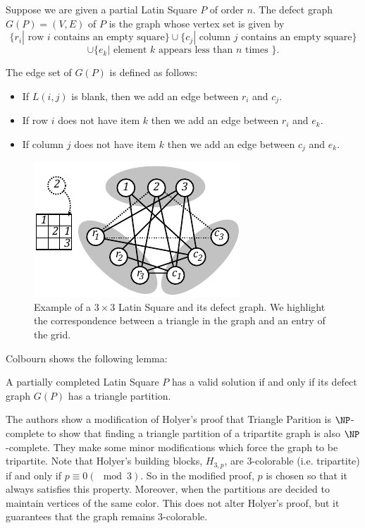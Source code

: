 \documentclass[runningheads,a4paper]{llncs}
\begin{document}
\begin{definition}
Suppose we are given a partial Latin Square $P$ of order $n$. The defect graph $G(P) = (V,E)$ of $P$ is the graph whose vertex set is given by $$\{ r_i | \text{ row } i \text{ contains an empty square} \} \cup \{ c_j | \text{ column } j \text{ contains an empty square} \} $$
$$ \cup \{ e_k | \text{ element } k\text{ appears less than } n \text{ times } \} .$$ 

The edge set of $G(P)$ is defined as follows: 

\begin{itemize}
	\item If $L(i,j)$ is blank, then we add an edge between $r_i$ and $c_j$. 
	\item If row $i$ does not have item $k$ then we add an edge between $r_i$ and $e_k$. 
	\item If column $j$ does not have item $k$ then we add an edge between $c_j$ and $e_k$.
\end{itemize}
\end{definition}

\begin{figure}
\centering
\label{fig:LStoTrianglePartitionExample}
\includegraphics[width=0.5\linewidth]{latinsquare_to_triangle_part_2.pdf}
\caption{Example of a $3\times 3$ Latin Square and its defect graph. We highlight the correspondence between a triangle in the graph and an entry of the grid.}
\end{figure}

Colbourn \cite{colbourn1984complexity} shows the following lemma: 
\begin{lemma}\label{TP:lemma}
A partially completed Latin Square $P$ has a valid solution if and only if its defect graph $G(P)$ has a triangle partition. 
 \end{lemma}
 
The authors show a modification of Holyer's proof that Triangle Parition is $\NP$-complete to show that finding a triangle partition of a tripartite graph is also $\NP$-complete. They make some minor modifications which force the graph to be tripartite. Note that Holyer's building blocks, $H_{3,p}$, are 3-colorable (i.e. tripartite) if and only if $p \equiv 0 (\mod 3)$. So in the modified proof, $p$ is chosen so that it always satisfies this property. Moreover, when the partitions are decided to maintain vertices of the same color. This does not alter Holyer's proof, but it guarantees that the graph remains 3-colorable. 
\end{document}
